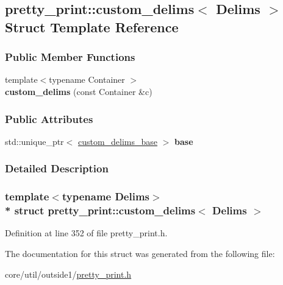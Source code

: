 \hypertarget{structpretty__print_1_1custom__delims}{}\subsection{pretty\+\_\+print\+:\+:custom\+\_\+delims$<$ Delims $>$ Struct Template Reference}
\label{structpretty__print_1_1custom__delims}
\subsubsection*{Public Member Functions}
\begin{DoxyCompactItemize}
\item 
{\footnotesize template$<$typename Container $>$ }\\{\bfseries custom\+\_\+delims} (const Container \&c)\hypertarget{structpretty__print_1_1custom__delims_a2a409f29696fc04d2d0dc952e78f3fb1}{}\label{structpretty__print_1_1custom__delims_a2a409f29696fc04d2d0dc952e78f3fb1}

\end{DoxyCompactItemize}
\subsubsection*{Public Attributes}
\begin{DoxyCompactItemize}
\item 
std\+::unique\+\_\+ptr$<$ \hyperlink{structpretty__print_1_1custom__delims__base}{custom\+\_\+delims\+\_\+base} $>$ {\bfseries base}\hypertarget{structpretty__print_1_1custom__delims_abb42668f748d45747781c92c6d6def3b}{}\label{structpretty__print_1_1custom__delims_abb42668f748d45747781c92c6d6def3b}

\end{DoxyCompactItemize}


\subsubsection{Detailed Description}
\subsubsection*{template$<$typename Delims$>$\\*
struct pretty\+\_\+print\+::custom\+\_\+delims$<$ Delims $>$}



Definition at line 352 of file pretty\+\_\+print.\+h.



The documentation for this struct was generated from the following file\+:\begin{DoxyCompactItemize}
\item 
core/util/outside1/\hyperlink{pretty__print_8h}{pretty\+\_\+print.\+h}\end{DoxyCompactItemize}
